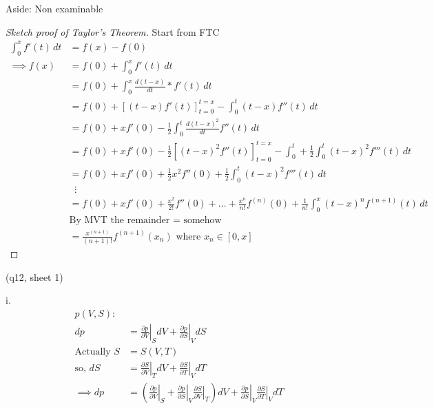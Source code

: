 \begin{aside}{Aside: Non examinable}
    \begin{proof}[Sketch proof of Taylor's Theorem]
        Start from FTC
        \begin{align*}
            \int_{0}^{x} f'(t) \,dt &= f(x) - f(0) \\
            \implies f(x) &= f(0) + \int_{0}^{x} f'(t) \,dt \\
            &= f(0) + \int_{0}^{x} \frac{d (t - x)}{d t} * f'(t) \,dt \\
            &= f(0) + [ (t - x) f'(t)]^{t = x}_{t = 0} - \int_{0}^{t} (t - x) f''(t) \,dt \\
            &= f(0) + xf'(0) - \frac{1}{2} \int_{0}^{t} \frac{d (t-x)^2}{d t} f''(t) \,dt \\
            &= f(0) + xf'(0) - \frac{1}{2} [(t-x)^2 f''(t)]^{t = x}_{t = 0} - \int_{0}^{t} + \frac{1}{2} \int_{0}^{t} (t - x)^2 f'''(t) \,dt \\
            &= f(0) + xf'(0) + \frac{1}{2} x^2 f''(0) + \frac{1}{2} \int_{0}^{t} (t - x)^2 f'''(t) \,dt \\
            &\;\;\vdots \\
            &= f(0) + xf'(0) + \frac{x^2}{2!} f''(0) + \ldots + \frac{x^n}{n!} f^{(n)}(0) + \frac{1}{n!} \int_{0}^{x} (t - x)^n f^{(n + 1)}(t) \,dt \\
            &\text{By MVT the remainder = somehow} \\
            &= \frac{x^{(n+1)}}{(n + 1)!} f^{(n + 1)}(x_n) \text{ where } x_n \in [0, x]
        \end{align*}
        \end{proof}
\end{aside}

(q12, sheet 1)

i. 
\begin{align*}
    p(V, S): \\
    dp &= \left. \frac{\partial p}{\partial V} \right|_S dV + \left. \frac{\partial p}{\partial S} \right|_V dS \\
    \text{Actually } S &= S(V, T) \\
    \text{so, } dS &= \left. \frac{\partial S}{\partial V} \right|_{T} dV + \left. \frac{\partial S}{\partial T} \right|_{V} dT \\
    \implies dp &= \left( \left. \frac{\partial p}{\partial V} \right|_{S} + \left. \frac{\partial p}{\partial S} \right|_{V} \left. \frac{\partial S}{\partial V} \right|_{T} \right) dV + \left. \frac{\partial p}{\partial S} \right|_{V} \left. \frac{\partial S}{\partial T} \right|_{V} dT
\end{align*} 

